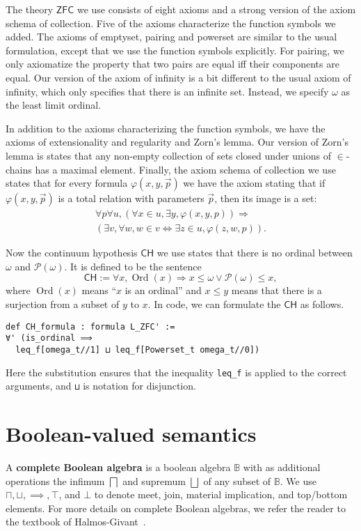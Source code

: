 \documentclass[sigplan,10pt,review, anonymous]{acmart}
\newcommand{\B}{\mathbb{B}}
\newcommand{\lil}{\lstinline}
\newcommand{\ZFC}{\mathsf{ZFC}}
\newcommand{\CH}{\mathsf{CH}}
\theoremstyle{definition}
\DeclareMathOperator{\Ord}{Ord}
\begin{document}
The theory \(\ZFC\) we use consists of eight axioms and a strong version of the axiom schema of collection.
Five of the axioms characterize the function symbols we added.
The axioms of emptyset, pairing and powerset are similar to the usual formulation, except that we use the function symbols explicitly.
For pairing, we only axiomatize the property that two pairs are equal iff their components are equal.
Our version of the axiom of infinity is a bit different to the usual axiom of infinity, which only specifies that there is an infinite set. Instead, we specify $\omega$ as the least limit ordinal.

In addition to the axioms characterizing the function symbols, we have the axioms of extensionality and regularity and Zorn's lemma.
Our version of Zorn's lemma is states that any non-empty collection of sets closed under unions of $\in$-chains has a maximal element.
Finally, the axiom schema of collection we use states that for every formula \(\varphi(x,y,\vec p)\) we have the axiom stating that if \(\varphi(x,y,\vec p)\) is a total relation with parameters \(\vec p\), then its image is a set:
\begin{gather*}
\forall p \forall u, (\forall x \in u, \exists y, \varphi(x,y,p)) \Rightarrow\\
(\exists v, \forall w, w \in v \iff \exists z \in u, \varphi(z,w,p)).
\end{gather*}

Now the continuum hypothesis \(\CH\) we use states that there is no ordinal between \(\omega\) and \(\mathcal{P}(\omega)\). It is defined to be the sentence
\[\CH:=\forall x, \Ord(x) \Rightarrow x \le \omega \vee \mathcal{P}(\omega) \le x,\]
where \(\Ord(x)\) means ``\(x\) is an ordinal'' and \(x \le y\) means that there is a surjection from a subset of \(y\) to \(x\). In code, we can formulate the \(\CH\) as follows.
\begin{lstlisting}
def CH_formula : formula L_ZFC' :=
∀' (is_ordinal ⟹
  leq_f[omega_t//1] ⊔ leq_f[Powerset_t omega_t//0])
\end{lstlisting}
Here the substitution ensures that the inequality \lil{leq_f} is applied to the correct arguments, and \lil{⊔} is notation for disjunction.

\section{Boolean-valued semantics}
\label{section:boolean-semantics}

A \textbf{complete Boolean algebra} is a boolean algebra $\B$ with as additional operations the infimum $\bigsqcap$ and supremum $\bigsqcup$ of any subset of $\B$.
We use $\sqcap, \sqcup, \implies, \top$, and $\bot$ to denote meet, join, material implication, and top/bottom elements.
For more details on complete Boolean algebras, we refer the reader to the textbook of Halmos-Givant~\cite{givant2008introduction}.
\end{document}
